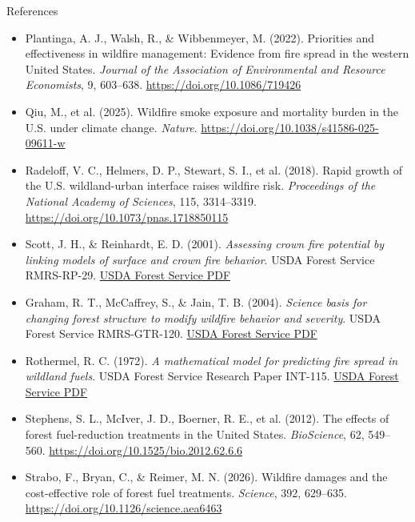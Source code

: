 \documentclass[10pt,aspectratio=169]{beamer}
\begin{document}
\begin{frame}[allowframebreaks]{References}
\begin{itemize}
    \item \hypertarget{ref:plantinga2022}{Plantinga, A. J., Walsh, R., \& Wibbenmeyer, M. (2022). Priorities and effectiveness in wildfire management: Evidence from fire spread in the western United States. \textit{Journal of the Association of Environmental and Resource Economists}, 9, 603--638. \href{https://doi.org/10.1086/719426}{https://doi.org/10.1086/719426}}
    \item \hypertarget{ref:qiu2025}{Qiu, M., et al. (2025). Wildfire smoke exposure and mortality burden in the U.S. under climate change. \textit{Nature}. \href{https://doi.org/10.1038/s41586-025-09611-w}{https://doi.org/10.1038/s41586-025-09611-w}}
    \item \hypertarget{ref:radeloff2018}{Radeloff, V. C., Helmers, D. P., Stewart, S. I., et al. (2018). Rapid growth of the U.S. wildland-urban interface raises wildfire risk. \textit{Proceedings of the National Academy of Sciences}, 115, 3314--3319. \href{https://doi.org/10.1073/pnas.1718850115}{https://doi.org/10.1073/pnas.1718850115}}
    \item \hypertarget{ref:scott2001}{Scott, J. H., \& Reinhardt, E. D. (2001). \textit{Assessing crown fire potential by linking models of surface and crown fire behavior}. USDA Forest Service RMRS-RP-29. \href{https://www.fs.usda.gov/rm/pubs/rmrs_rp029.pdf}{USDA Forest Service PDF}}
    \item \hypertarget{ref:graham2004}{Graham, R. T., McCaffrey, S., \& Jain, T. B. (2004). \textit{Science basis for changing forest structure to modify wildfire behavior and severity}. USDA Forest Service RMRS-GTR-120. \href{https://www.fs.usda.gov/rm/pubs/rmrs_gtr120.pdf}{USDA Forest Service PDF}}
    \item \hypertarget{ref:rothermel1972}{Rothermel, R. C. (1972). \textit{A mathematical model for predicting fire spread in wildland fuels}. USDA Forest Service Research Paper INT-115. \href{https://www.fs.usda.gov/rm/pubs_int/int_rp115.pdf}{USDA Forest Service PDF}}
    \item \hypertarget{ref:stephens2012}{Stephens, S. L., McIver, J. D., Boerner, R. E., et al. (2012). The effects of forest fuel-reduction treatments in the United States. \textit{BioScience}, 62, 549--560. \href{https://doi.org/10.1525/bio.2012.62.6.6}{https://doi.org/10.1525/bio.2012.62.6.6}}
    \item \hypertarget{ref:strabo2026}{Strabo, F., Bryan, C., \& Reimer, M. N. (2026). Wildfire damages and the cost-effective role of forest fuel treatments. \textit{Science}, 392, 629--635. \href{https://doi.org/10.1126/science.aea6463}{https://doi.org/10.1126/science.aea6463}}

\end{itemize}
\end{frame}
\end{document}
